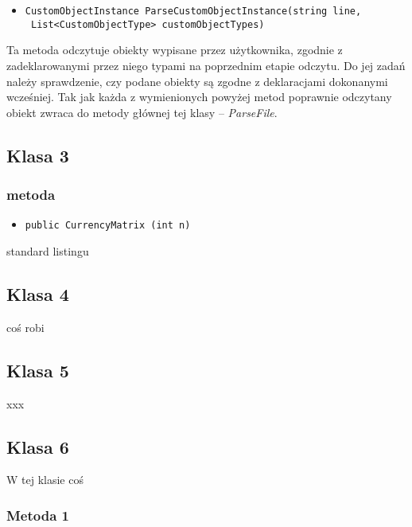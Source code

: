 \documentclass[a4paper,11pt]{article}
\newcommand\tab[1][0.6cm]{\hspace*{#1}}
\begin{document}
\begin{itemize}
\item \begin{lstlisting}
CustomObjectInstance ParseCustomObjectInstance(string line,
 List<CustomObjectType> customObjectTypes)
\end{lstlisting}
\end{itemize}

\tab Ta metoda odczytuje obiekty wypisane przez użytkownika, zgodnie z zadeklarowanymi przez niego typami na poprzednim etapie odczytu. Do jej zadań należy sprawdzenie, czy podane obiekty są zgodne z deklaracjami dokonanymi wcześniej. Tak jak każda z wymienionych powyżej metod poprawnie odczytany obiekt zwraca do metody głównej tej klasy -- \textit{ParseFile}.

\subsection{Klasa 3}
\tab 

\subsubsection{metoda}
\begin{itemize}
\item \begin{lstlisting}
public CurrencyMatrix (int n)
\end{lstlisting}
\end{itemize}

\tab standard listingu

\subsection{Klasa 4}

\tab coś robi


\subsection{Klasa 5}

\tab xxx

\subsection{Klasa 6}

\tab W tej klasie coś

\subsubsection{Metoda 1}
\end{document}

